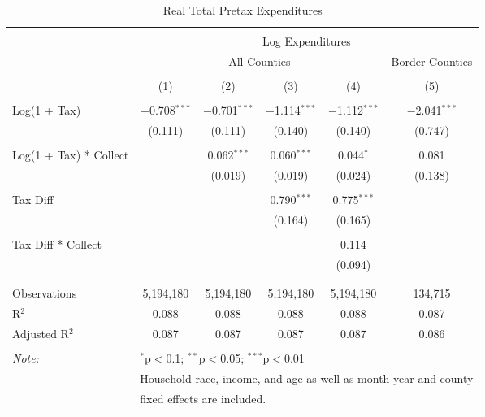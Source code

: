 
\begin{table}[!htbp] \centering 
  \caption{Real Total Pretax Expenditures} 
  \label{} 
\begin{tabular}{@{\extracolsep{5pt}}lccccc} 
\\[-1.8ex]\hline 
\hline \\[-1.8ex] 
 & \multicolumn{5}{c}{Log Expenditures} \\ 
\cline{2-6} 
 & \multicolumn{4}{c}{All Counties} & Border Counties \\ 
\\[-1.8ex] & (1) & (2) & (3) & (4) & (5)\\ 
\hline \\[-1.8ex] 
 Log(1 + Tax) & $-$0.708$^{***}$ & $-$0.701$^{***}$ & $-$1.114$^{***}$ & $-$1.112$^{***}$ & $-$2.041$^{***}$ \\ 
  & (0.111) & (0.111) & (0.140) & (0.140) & (0.747) \\ 
  & & & & & \\ 
 Log(1 + Tax) * Collect &  & 0.062$^{***}$ & 0.060$^{***}$ & 0.044$^{*}$ & 0.081 \\ 
  &  & (0.019) & (0.019) & (0.024) & (0.138) \\ 
  & & & & & \\ 
 Tax Diff &  &  & 0.790$^{***}$ & 0.775$^{***}$ &  \\ 
  &  &  & (0.164) & (0.165) &  \\ 
  & & & & & \\ 
 Tax Diff * Collect &  &  &  & 0.114 &  \\ 
  &  &  &  & (0.094) &  \\ 
  & & & & & \\ 
\hline \\[-1.8ex] 
Observations & 5,194,180 & 5,194,180 & 5,194,180 & 5,194,180 & 134,715 \\ 
R$^{2}$ & 0.088 & 0.088 & 0.088 & 0.088 & 0.087 \\ 
Adjusted R$^{2}$ & 0.087 & 0.087 & 0.087 & 0.087 & 0.086 \\ 
\hline 
\hline \\[-1.8ex] 
\textit{Note:}  & \multicolumn{5}{l}{$^{*}$p$<$0.1; $^{**}$p$<$0.05; $^{***}$p$<$0.01} \\ 
 & \multicolumn{5}{l}{Household race, income, and age as well as month-year and county} \\ 
 & \multicolumn{5}{l}{fixed effects are included.} \\ 
\end{tabular} 
\end{table} 

